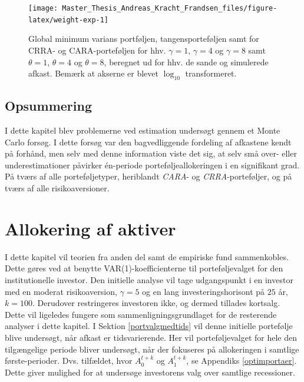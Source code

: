 \documentclass[
  a4paper,
  oneside]{memoir}
\begin{document}
\begin{figure}[H]

{\centering \texttt{[image: Master\_Thesis\_Andreas\_Kracht\_Frandsen\_files/figure-latex/weight-exp-1]} 

}

\caption[Afkast-volatilitets spektrummet for simulering.]{Global minimum varians portføljen, tangensporteføljen samt for CRRA- og CARA-porteføljen for hhv. $\gamma=1$, $\gamma=4$ og $\gamma=8$ samt $\theta=1$, $\theta=4$ og $\theta=8$, beregnet ud for hhv. de sande og simulerede afkast. Bemærk at akserne er blevet $\log_{10}$ transformeret.}\label{fig:weight-exp}
\end{figure}

\hypertarget{opsummering-3}{%
\section{Opsummering}\label{opsummering-3}}

I dette kapitel blev problemerne ved estimation undersøgt gennem et Monte Carlo forsøg. I dette forsøg var den bagvedliggende fordeling af afkastene kendt på forhånd, men selv med denne information viste det sig, at selv små over- eller underestimationer påvirker én-periode porteføljeallokeringen i en signifikant grad. På tværs af alle porteføljetyper, heriblandt \emph{CARA}- og \emph{CRRA}-porteføljer, og på tværs af alle risikoaversioner.

\hypertarget{alloafakt}{%
\chapter{Allokering af aktiver}\label{alloafakt}}

I dette kapitel vil teorien fra anden del samt de empiriske fund sammenkobles. Dette gøres ved at benytte VAR(1)-koefficienterne til porteføljevalget for den institutionelle investor. Den initielle analyse vil tage udgangspunkt i en investor med en moderat risikoaversion, \(\gamma=5\) og en lang investeringshorisont på \(25\) år, \(k=100\). Derudover restringeres investoren ikke, og dermed tillades kortsalg. Dette vil ligeledes fungere som sammenligningsgrundlaget for de resterende analyser i dette kapitel. I Sektion \ref{portvalgmedtids} vil denne initielle portefølje blive undersøgt, når afkast er tidsvarierende. Her vil porteføljevalget for hele den tilgængelige periode bliver undersøgt, når der fokuseres på allokeringen i samtlige første-perioder. Dvs. tilfældet, hvor \(A_0^{t+k}\) og \(A_1^{t+k}\), se Appendiks \ref{optimportaer}. Dette giver mulighed for at undersøge investorens valg over samtlige recessioner.
\end{document}
